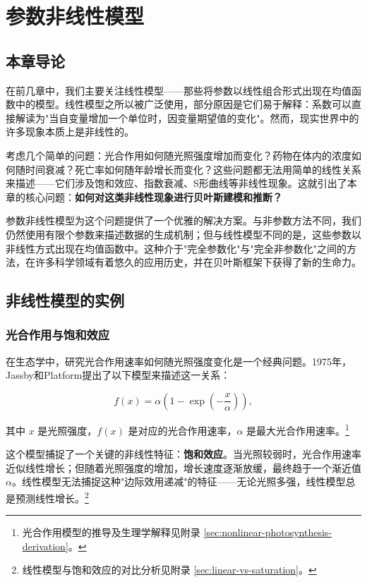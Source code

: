 
\chapter{参数非线性模型}

\section{本章导论}

在前几章中，我们主要关注线性模型——那些将参数以线性组合形式出现在均值函数中的模型。线性模型之所以被广泛使用，部分原因是它们易于解释：系数可以直接解读为"当自变量增加一个单位时，因变量期望值的变化"。然而，现实世界中的许多现象本质上是非线性的。

考虑几个简单的问题：光合作用如何随光照强度增加而变化？药物在体内的浓度如何随时间衰减？死亡率如何随年龄增长而变化？这些问题都无法用简单的线性关系来描述——它们涉及饱和效应、指数衰减、S形曲线等非线性现象。这就引出了本章的核心问题：\textbf{如何对这类非线性现象进行贝叶斯建模和推断？}

参数非线性模型为这个问题提供了一个优雅的解决方案。与非参数方法不同，我们仍然使用有限个参数来描述数据的生成机制；但与线性模型不同的是，这些参数以非线性方式出现在均值函数中。这种介于"完全参数化"与"完全非参数化"之间的方法，在许多科学领域有着悠久的应用历史，并在贝叶斯框架下获得了新的生命力。

\section{非线性模型的实例}

\subsection{光合作用与饱和效应}

在生态学中，研究光合作用速率如何随光照强度变化是一个经典问题。1975年，Jassby和Platform提出了以下模型来描述这一关系：

\begin{equation}
f(x) = \alpha \left(1 - \exp\left(-\frac{x}{\alpha}\right)\right), \label{eq:photosynthesis-model}
\end{equation}

其中 $x$ 是光照强度，$f(x)$ 是对应的光合作用速率，$\alpha$ 是最大光合作用速率。\footnote{光合作用模型的推导及生理学解释见附录 \cref{sec:nonlinear-photosynthesis-derivation}。}

这个模型捕捉了一个关键的非线性特征：\textbf{饱和效应}。当光照较弱时，光合作用速率近似线性增长；但随着光照强度的增加，增长速度逐渐放缓，最终趋于一个渐近值 $\alpha$。线性模型无法捕捉这种"边际效用递减"的特征——无论光照多强，线性模型总是预测线性增长。\footnote{线性模型与饱和效应的对比分析见附录 \cref{sec:linear-vs-saturation}。}

